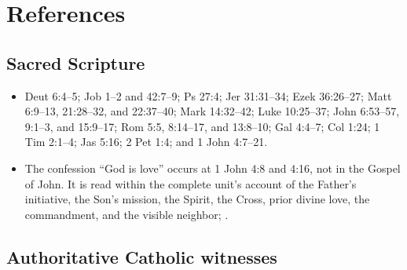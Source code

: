 \section{References}

\begingroup
\setlength{\parskip}{0pt}
\titlespacing*{\subsection}{0pt}{1.0ex}{0.3ex}

\subsection*{Sacred Scripture}

{\fontsize{8.6}{9.6}\selectfont
\begin{itemize}[itemsep=0pt,parsep=0pt,topsep=0.05em]
\item Deut 6:4--5; Job 1--2 and 42:7--9; Ps 27:4; Jer 31:31--34; Ezek 36:26--27; Matt 6:9--13, 21:28--32, and 22:37--40; Mark 14:32--42; Luke 10:25--37; John 6:53--57, 9:1--3, and 15:9--17; Rom 5:5, 8:14--17, and 13:8--10; Gal 4:4--7; Col 1:24; 1 Tim 2:1--4; Jas 5:16; 2 Pet 1:4; and 1 John 4:7--21.
\item The confession ``God is love'' occurs at 1 John 4:8 and 4:16, not in the Gospel of John. It is read within the complete unit's account of the Father's initiative, the Son's mission, the Spirit, the Cross, prior divine love, the commandment, and the visible neighbor; .
\end{itemize}}

\subsection*{Authoritative Catholic witnesses}

